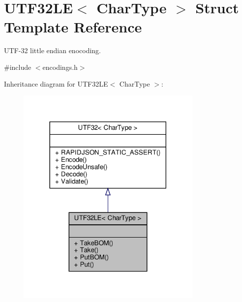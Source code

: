 \hypertarget{structUTF32LE}{}\section{U\+T\+F32\+LE$<$ Char\+Type $>$ Struct Template Reference}
\label{structUTF32LE}


U\+T\+F-\/32 little endian enocoding.  




{\ttfamily \#include $<$encodings.\+h$>$}



Inheritance diagram for U\+T\+F32\+LE$<$ Char\+Type $>$\+:
\nopagebreak
\begin{figure}[H]
\begin{center}
\leavevmode
\includegraphics[width=257pt]{structUTF32LE__inherit__graph}
\end{center}
\end{figure}


